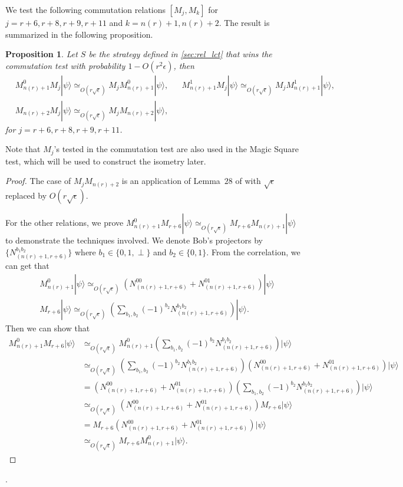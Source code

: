 \documentclass[11pt,letterpaper]{article}
\newcommand{\ket}[1]{|#1\rangle}
\newcommand{\1}{\mathbb{1}}
\newcommand{\nr}{n(r)}
\newcommand{\ep}{\epsilon}
\newcommand{\se}{\sqrt{\epsilon}}
\newcommand{\appd}[1]{\simeq_{#1}}
\newtheorem{proposition}[theorem]{Proposition}
\theoremstyle{definition}
\begin{document}
We test the following commutation relations $[M_j, M_k]$ for $j = r+6, r+8,r+9,r+11$ and $k = \nr+1, \nr+2$.
The result is summarized in the following proposition.
\begin{proposition}
	\label{prop:rel_comm}
	Let $S$ be the strategy defined in \cref{sec:rel_lct} that wins the commutation test with probability $1- O(r^2\ep)$,
	then 
	\begin{align}
		&M_{\nr+1}^0 M_j \ket{\psi} \appd{O(r\se)} M_{j} M_{\nr+1}^0 \ket{\psi}, &&
		M_{\nr+1}^1 M_j \ket{\psi} \appd{O(r\se)} M_{j} M_{\nr+1}^1 \ket{\psi}, \\
		&M_{\nr+2} M_j \ket{\psi} \appd{O(r\se)} M_j M_{\nr+2} \ket{\psi},
	\end{align}
	for $j = r+6, r+8,r+9,r+11$.
\end{proposition}
Note that $M_j$'s tested in the commutation test are also used in the Magic Square test,
which will be used to construct the isometry later.
\begin{proof}
	The case of $M_j M_{\nr+2}$ is an application of Lemma~$28$ of \cite{coladan2017verifier} with $\se$ replaced by $O(r\se)$.
	
	For the other relations, we prove $M_{\nr+1}^0M_{r+6} \ket{\psi} \appd{O(r\se)} M_{r+6}M_{\nr+1} \ket{\psi}$ to demonstrate 
	the techniques involved. We denote Bob's projectors by $\{ N_{(\nr+1, r+6)}^{b_1 b_2} \}$ where $b_1 \in \{0, 1, \perp\}$ and
	$b_2 \in \{0,1\}$. From the correlation, we can get that 
	\begin{align}
		&M_{\nr+1}^0 \ket{\psi} \appd{O(r\se)} (N_{(\nr+1, r+6)}^{00} + N_{(\nr+1, r+6)}^{01}) \ket{\psi} \\
		&M_{r+6} \ket{\psi} \appd{O(r\se)} (\sum_{b_1, b_2} (-1)^{b_2}N_{(\nr+1, r+6)}^{b_1b_2})\ket{\psi}.
	\end{align}
	Then we can show that
	\begin{align}
		M_{\nr+1}^0 M_{r+6} \ket{\psi} &\appd{O(r\se)} M_{\nr+1}^0 (\sum_{b_1, b_2} (-1)^{b_2}N_{(\nr+1, r+6)}^{b_1b_2})\ket{\psi}\\
		&\appd{O(r\se)}(\sum_{b_1, b_2} (-1)^{b_2}N_{(\nr+1, r+6)}^{b_1b_2}) (N_{(\nr+1, r+6)}^{00} + N_{(\nr+1, r+6)}^{01})
		\ket{\psi} \\
		&= (N_{(\nr+1, r+6)}^{00} + N_{(\nr+1, r+6)}^{01}) (\sum_{b_1, b_2} (-1)^{b_2}N_{(\nr+1, r+6)}^{b_1b_2})  \ket{\psi} \\
		& \appd{O(r\se)} (N_{(\nr+1, r+6)}^{00} + N_{(\nr+1, r+6)}^{01}) M_{r+6} \ket{\psi} \\
		&= M_{r+6}  (N_{(\nr+1, r+6)}^{00} + N_{(\nr+1, r+6)}^{01}) \ket{\psi} \\
		& \appd{O(r\se)} M_{r+6}M_{\nr+1}^0 \ket{\psi}.
	\end{align}
\end{proof}
.
\end{document}
